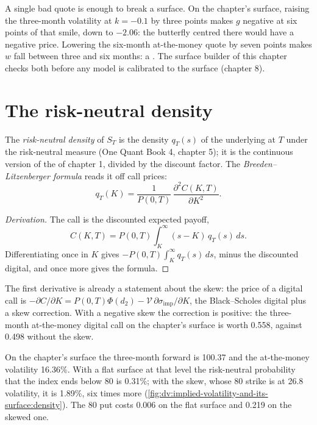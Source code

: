 A single bad quote is enough to break a surface. On the chapter's surface, raising the
three-month volatility at $k=-0.1$ by three points makes $g$ negative at six points of that
smile, down to $-2.06$: the butterfly centred there would have a negative price. Lowering
the six-month at-the-money quote by seven points makes $w$ fall between three and six months:
a . The surface builder of this chapter checks both before any model is
calibrated to the surface (chapter 8).

\section{The risk-neutral density}

\begin{definition}\label{def:dv:implied-volatility-and-its-surface:density}
The \emph{risk-neutral density} of $S_T$ is the density
$q_T(s)$ of the underlying at $T$ under the risk-neutral measure (One Quant Book 4,
chapter 5); it is the continuous version of the  of chapter 1, divided by the
discount factor. The \emph{Breeden--Litzenberger formula}
reads it off call prices:
\[
q_T(K)=\frac{1}{P(0,T)}\,\frac{\partial^2C(K,T)}{\partial K^2}.
\]
\end{definition}
\begin{proof}[Derivation]
The call is the discounted expected payoff,
\[
C(K,T)=P(0,T)\int_K^\infty(s-K)\,q_T(s)\,ds .
\]
Differentiating once in $K$ gives $-P(0,T)\int_K^\infty q_T(s)\,ds$, minus the discounted
digital, and once more gives the formula.
\end{proof}

The first derivative is already a statement about the skew: the price of a digital call is
$-\partial C/\partial K=P(0,T)\Phi(d_2)-\mathcal V\,\partial\sigma_{\mathrm{imp}}/\partial K$,
the Black--Scholes digital plus a skew correction. With a negative skew the correction is
positive: the three-month at-the-money digital call on the chapter's surface is worth 0.558,
against 0.498 without the skew.

\begin{example}\label{ex:dv:implied-volatility-and-its-surface:crash}
On the chapter's surface the three-month forward is 100.37 and the at-the-money volatility
16.36\%. With a flat surface at that level the risk-neutral probability that the index ends
below 80 is 0.31\%; with the skew, whose 80 strike is at 26.8 volatility, it is 1.89\%, six
times more (\cref{fig:dv:implied-volatility-and-its-surface:density}). The 80 put costs 0.006
on the flat surface and 0.219 on the skewed one.
\end{example}

